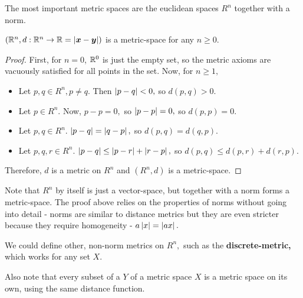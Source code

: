\documentclass{article}
\begin{document}
The most important metric spaces are the euclidean spaces $R^n$ together with a norm.

\begin{theorem}\label{euclidean-space-is-metric-space}
$(\mathbb{R}^n, d : \mathbb{R}^n \to \mathbb{R} = \left| \boldsymbol{x} - \boldsymbol{y} \right|)$ is a \@{metric-space} for any $n \geq 0.$
\end{theorem}

\begin{proof}
First, for $n = 0$, $\mathbb{R}^0$ is just the empty set, so the metric axioms are vacuously satisfied for all points in the set. Now, for $n \geq 1,$

\begin{itemize}
\item Let $p, q \in R^n, p \neq q.$ Then $\left| p - q \right| < 0,$ so $d(p,q) > 0.$
\end{itemize}

\begin{itemize}
\item Let $p \in R^n.$ Now, $p - p = 0,$ so $\left| p - p \right| = 0,$ so $d(p,p) = 0.$
\end{itemize}

\begin{itemize}
\item Let $p, q \in R^n.$ $\left| p - q \right| = \left| q - p \right|,$ so $d(p,q) = d(q, p).$
\end{itemize}

\begin{itemize}
\item Let $p, q, r \in R^n.$ $\left| p - q \right| \leq \left| p - r \right| + \left| r - p \right|,$ so $d(p,q) \leq d(p,r) + d(r, p).$
\end{itemize}

Therefore, $d$ is a metric on $R^n$ and $(R^n, d)$ is a \@{metric-space}.
\end{proof}

\detach

\begin{remark}\label{rn-vector-space-vs-metric-space}
Note that $R^n$ by itself is just a \@{vector-space}, but together with a \@{norm} forms a \@{metric-space}. The proof above relies on the properties of norms without going into detail - norms are similar to distance metrics but they are even stricter because they require homogeneity - $a\left| x \right| = \left| ax \right|.$

We could define other, non-norm metrics on $R^n,$ such as the \textbf{\@{discrete-metric},} which works for any set $X.$

Also note that every \@{subset} of a $Y$ of a metric space $X$ is a metric space on its own, using the same distance function.
\end{remark}
\end{document}
